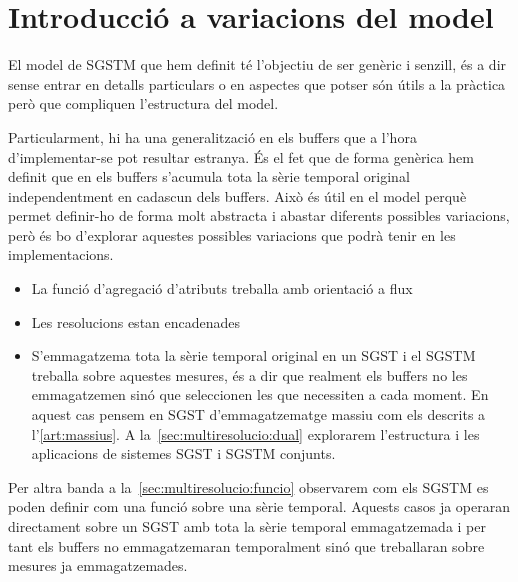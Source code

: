 \chapter{Introducció a variacions del model}




El model de \gls{SGSTM} que hem definit té l'objectiu de ser genèric i senzill, és a dir sense entrar en detalls particulars o en aspectes que potser són útils a la pràctica però que compliquen l'estructura del model.


Particularment, hi ha una generalització en els buffers que a l'hora d'implementar-se pot resultar estranya. És el fet que de forma genèrica hem definit que en els buffers s'acumula tota la sèrie temporal original independentment en cadascun dels buffers. Això és útil en el model perquè permet definir-ho de forma molt abstracta i abastar diferents possibles variacions, però és bo d'explorar aquestes possibles variacions que podrà tenir en les implementacions.

\begin{itemize}
\item La funció d'agregació d'atributs treballa amb orientació a flux

\item Les resolucions estan encadenades

\item S'emmagatzema tota la sèrie temporal original en un \gls{SGST} i el
\gls{SGSTM} treballa sobre aquestes mesures, és a dir que realment els
buffers no les emmagatzemen sinó que seleccionen les que necessiten a
cada moment. En aquest cas pensem en \gls{SGST} d'emmagatzematge
massiu com els descrits a l'\autoref{art:massius}. A
la~\autoref{sec:multiresolucio:dual} explorarem l'estructura i les
aplicacions de sistemes \gls{SGST} i \gls{SGSTM} conjunts.

\end{itemize}

Per altra banda a la~\autoref{sec:multiresolucio:funcio} observarem com els \gls{SGSTM} es poden definir com una funció sobre una sèrie temporal. Aquests casos ja operaran directament sobre un \gls{SGST} amb tota la sèrie temporal emmagatzemada i per tant els buffers no emmagatzemaran temporalment sinó que treballaran sobre mesures ja emmagatzemades. 









